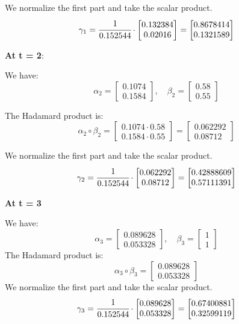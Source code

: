We normalize the first part and take the scalar product.
\[
\gamma_1 = \cfrac{1}{0.152544} \cdot \begin{bmatrix}
    0.132384 \\ 0.02016
\end{bmatrix} = \begin{bmatrix}
    0.8678414 \\ 0.1321589
\end{bmatrix}
\]

\textbf{At t = 2}:

We have:
\[
\alpha_2 = \begin{bmatrix}
    0.1074 \\ 0.1584
\end{bmatrix}, \quad \beta_2 = \begin{bmatrix}
    0.58 \\ 0.55
\end{bmatrix}
\]

The Hadamard product is:
\[
\alpha_2 \circ \beta_2 = \begin{bmatrix}
    0.1074 \cdot 0.58 \\ 0.1584 \cdot 0.55
\end{bmatrix} = \begin{bmatrix}
    0.062292 \\ 0.08712
\end{bmatrix}
\]

We normalize the first part and take the scalar product.
\[
\gamma_2 = \cfrac{1}{0.152544} \cdot \begin{bmatrix}
    0.062292 \\ 0.08712 \end{bmatrix} = \begin{bmatrix}
        0.42888609 \\ 0.57111391
    \end{bmatrix}
\]

\textbf{At t = 3}

We have: 
\[
\alpha_3 = \begin{bmatrix}
    0.089628 \\ 0.053328
\end{bmatrix}, \quad \beta_3 = \begin{bmatrix}
    1 \\ 1
\end{bmatrix}
\]
The Hadamard product is:
\[
\alpha_3 \circ \beta_3 = \begin{bmatrix}
0.089628 \\ 0.053328
\end{bmatrix}
\]
We normalize the first part and take the scalar product.
\[
\gamma_3 = \cfrac{1}{0.152544} \cdot \begin{bmatrix}
    0.089628 \\ 0.053328 \end{bmatrix} = \begin{bmatrix}
        0.67400881 \\ 0.32599119
    \end{bmatrix}
\]


